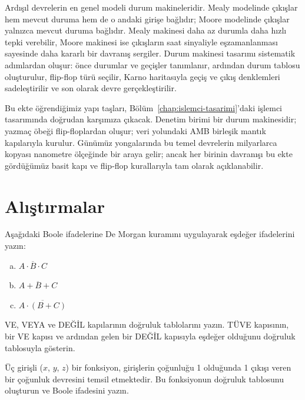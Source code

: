Ardışıl devrelerin en genel modeli durum makineleridir. Mealy modelinde çıkışlar hem mevcut duruma hem de o andaki girişe bağlıdır; Moore modelinde çıkışlar yalnızca mevcut duruma bağlıdır. Mealy makinesi daha az durumla daha hızlı tepki verebilir, Moore makinesi ise çıkışların saat sinyaliyle eşzamanlanması sayesinde daha kararlı bir davranış sergiler. Durum makinesi tasarımı sistematik adımlardan oluşur: önce durumlar ve geçişler tanımlanır, ardından durum tablosu oluşturulur, flip-flop türü seçilir, Karno haritasıyla geçiş ve çıkış denklemleri sadeleştirilir ve son olarak devre gerçekleştirilir.

Bu ekte öğrendiğimiz yapı taşları, Bölüm~\ref{chap:islemci-tasarimi}'daki işlemci tasarımında doğrudan karşımıza çıkacak. Denetim birimi bir durum makinesidir; yazmaç öbeği flip-floplardan oluşur; veri yolundaki AMB birleşik mantık kapılarıyla kurulur. Günümüz yongalarında bu temel devrelerin milyarlarca kopyası nanometre ölçeğinde bir araya gelir; ancak her birinin davranışı bu ekte gördüğümüz basit kapı ve flip-flop kurallarıyla tam olarak açıklanabilir.


\section*{Alıştırmalar}
\label{sec:ekB-alistirmalar}

\begin{alistirma}[\kolay]
Aşağıdaki Boole ifadelerine De Morgan kuramını uygulayarak eşdeğer ifadelerini yazın:
\begin{enumerate}[(a)]
    \item $\overline{A \cdot B \cdot C}$
    \item $\overline{A + B + C}$
    \item $\overline{A \cdot (B + C)}$
\end{enumerate}
\end{alistirma}

\begin{alistirma}[\kolay]
VE, VEYA ve DEĞİL kapılarının doğruluk tablolarını yazın. TÜVE kapısının, bir VE kapısı ve ardından gelen bir DEĞİL kapısıyla eşdeğer olduğunu doğruluk tablosuyla gösterin.
\end{alistirma}

\begin{alistirma}[\orta]
Üç girişli ($x$, $y$, $z$) bir fonksiyon, girişlerin çoğunluğu 1 olduğunda 1 çıkışı veren bir çoğunluk devresini temsil etmektedir. Bu fonksiyonun doğruluk tablosunu oluşturun ve Boole ifadesini yazın.
\end{alistirma}

